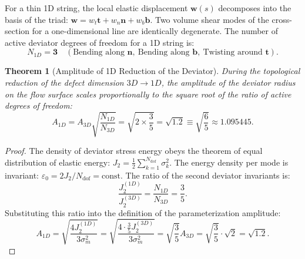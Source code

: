 \documentclass[12pt,a4paper]{article}
\newtheorem{theorem}{Theorem}
\begin{document}
	For a thin 1D string, the local elastic displacement $\mathbf{w}(s)$ decomposes into the basis of the triad: $\mathbf{w} = w_t \mathbf{t} + w_n \mathbf{n} + w_b \mathbf{b}$. Two volume shear modes of the cross-section for a one-dimensional line are identically degenerate. The number of active deviator degrees of freedom for a 1D string is:
	\begin{equation}
	N_{1D} = \mathbf{3} \quad (\text{Bending along } \mathbf{n}, \ \text{Bending along } \mathbf{b}, \ \text{Twisting around } \mathbf{t}).
	\end{equation}
			
	\begin{theorem}[Amplitude of 1D Reduction of the Deviator]
	During the topological reduction of the defect dimension $3D \to 1D$, the amplitude of the deviator radius on the flow surface scales proportionally to the square root of the ratio of active degrees of freedom:
	\begin{equation}
	A_{1D} = A_{3D} \sqrt{\frac{N_{1D}}{N_{3D}}} = \sqrt{2 \times \frac{3}{5}} = \mathbf{\sqrt{1.2}} \equiv \sqrt{\frac{6}{5}} \approx 1.095445.
	\end{equation}
	\end{theorem}
			
	\begin{proof}
	The density of deviator stress energy obeys the theorem of equal distribution of elastic energy: $J_2 = \frac{1}{2}\sum_{k=1}^{N_{\text{dof}}} \sigma_k^2$. The energy density per mode is invariant: $\varepsilon_0 = 2 J_2 / N_{\text{dof}} = \mathrm{const}$. The ratio of the second deviator invariants is:
	\begin{equation}
	\frac{J_2^{(1D)}}{J_2^{(3D)}} = \frac{N_{1D}}{N_{3D}} = \frac{3}{5}.
	\end{equation}
	Substituting this ratio into the definition of the parameterization amplitude:
	\begin{equation}
	A_{1D} = \sqrt{\frac{4 J_2^{(1D)}}{3 \sigma_m^2}} = \sqrt{\frac{4 \cdot \frac{3}{5} J_2^{(3D)}}{3 \sigma_m^2}} = \sqrt{\frac{3}{5}} A_{3D} = \sqrt{\frac{3}{5}} \cdot \sqrt{2} = \mathbf{\sqrt{1.2}}.
	\end{equation}
	\end{proof}
				
\end{document}

